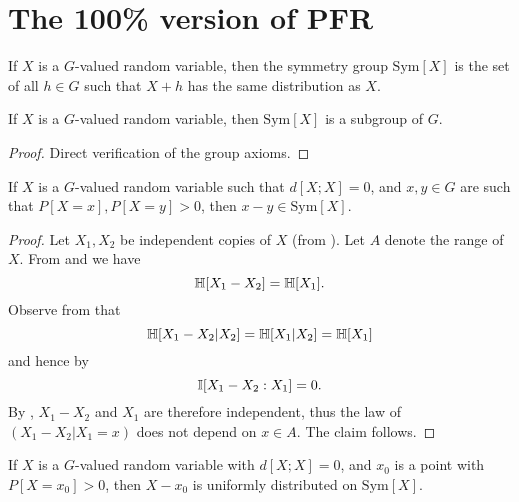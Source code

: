 \chapter{The 100\% version of PFR}

\begin{definition}\label{sym-group-def}
\leanok
If $X$ is a $G$-valued random variable, then the symmetry group $\mathrm{Sym}[X]$ is the set of all $h \in G$ such that $X +h$ has the same distribution as $X$.
\end{definition}

\begin{lemma}\label{sym-group}
\leanok
If $X$ is a $G$-valued random variable, then $\mathrm{Sym}[X]$ is a subgroup of $G$.
\end{lemma}

\begin{proof}\leanok Direct verification of the group axioms.
\end{proof}

\begin{lemma}\label{zero-large}
  \leanok  If $X$ is a $G$-valued random variable such that
  $d[X ;X]=0$, and $x,y \in G$ are such that $P[X=x], P[X=y]>0$, then $x-y \in \mathrm{Sym}[X]$.
\end{lemma}

\begin{proof}
  \leanok
   Let $X_1,X_2$ be independent copies of $X$ (from ). Let $A$ denote the range of $X$.  From  and  we have
  $$ \mathbb{H}[X_1-X_2] = \mathbb{H}[X_1].$$
Observe from  that
$$ \mathbb{H}[X_1-X_2|X_2] = \mathbb{H}[X_1|X_2] = \mathbb{H}[X_1]$$
and hence by 
$$ \mathbb{I}[X_1-X_2 : X_1] = 0.$$
By , $X_1-X_2$ and $X_1$ are therefore independent, thus the law of $(X_1-X_2|X_1=x)$ does not depend on $x \in A$. The claim follows.
\end{proof}

\begin{lemma}\label{sym-zero}
\leanok
  If $X$ is a $G$-valued random variable with $d[X ;X]=0$, and $x_0$ is a point with $P[X=x_0] > 0$, then $X-x_0$ is uniformly distributed on $\mathrm{Sym}[X]$.
\end{lemma}

